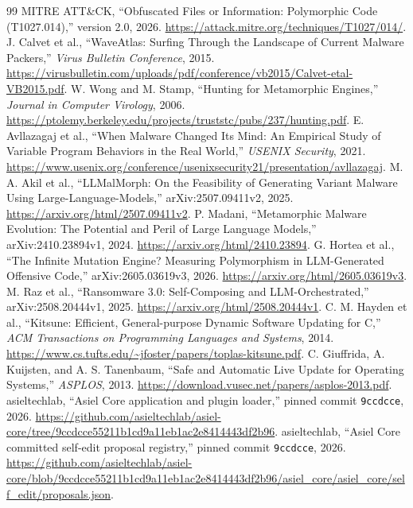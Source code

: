 \documentclass[11pt,letterpaper]{article}
\begin{document}
\begingroup\small\raggedright
\begin{thebibliography}{99}
 MITRE ATT\&CK, ``Obfuscated Files or Information: Polymorphic Code (T1027.014),'' version 2.0, 2026. \url{https://attack.mitre.org/techniques/T1027/014/}.
 J. Calvet et al., ``WaveAtlas: Surfing Through the Landscape of Current Malware Packers,'' \emph{Virus Bulletin Conference}, 2015. \url{https://virusbulletin.com/uploads/pdf/conference/vb2015/Calvet-etal-VB2015.pdf}.
 W. Wong and M. Stamp, ``Hunting for Metamorphic Engines,'' \emph{Journal in Computer Virology}, 2006. \url{https://ptolemy.berkeley.edu/projects/truststc/pubs/237/hunting.pdf}.
 E. Avllazagaj et al., ``When Malware Changed Its Mind: An Empirical Study of Variable Program Behaviors in the Real World,'' \emph{USENIX Security}, 2021. \url{https://www.usenix.org/conference/usenixsecurity21/presentation/avllazagaj}.
 M. A. Akil et al., ``LLMalMorph: On the Feasibility of Generating Variant Malware Using Large-Language-Models,'' arXiv:2507.09411v2, 2025. \url{https://arxiv.org/html/2507.09411v2}.
 P. Madani, ``Metamorphic Malware Evolution: The Potential and Peril of Large Language Models,'' arXiv:2410.23894v1, 2024. \url{https://arxiv.org/html/2410.23894}.
 G. Hortea et al., ``The Infinite Mutation Engine? Measuring Polymorphism in LLM-Generated Offensive Code,'' arXiv:2605.03619v3, 2026. \url{https://arxiv.org/html/2605.03619v3}.
 M. Raz et al., ``Ransomware 3.0: Self-Composing and LLM-Orchestrated,'' arXiv:2508.20444v1, 2025. \url{https://arxiv.org/html/2508.20444v1}.
 C. M. Hayden et al., ``Kitsune: Efficient, General-purpose Dynamic Software Updating for C,'' \emph{ACM Transactions on Programming Languages and Systems}, 2014. \url{https://www.cs.tufts.edu/~jfoster/papers/toplas-kitsune.pdf}.
 C. Giuffrida, A. Kuijsten, and A. S. Tanenbaum, ``Safe and Automatic Live Update for Operating Systems,'' \emph{ASPLOS}, 2013. \url{https://download.vusec.net/papers/asplos-2013.pdf}.
 asieltechlab, ``Asiel Core application and plugin loader,'' pinned commit \texttt{9ccdcce}, 2026. \url{https://github.com/asieltechlab/asiel-core/tree/9ccdcce55211b1cd9a11eb1ac2e8414443df2b96}.
 asieltechlab, ``Asiel Core committed self-edit proposal registry,'' pinned commit \texttt{9ccdcce}, 2026. \url{https://github.com/asieltechlab/asiel-core/blob/9ccdcce55211b1cd9a11eb1ac2e8414443df2b96/asiel_core/asiel_core/self_edit/proposals.json}.

\end{thebibliography}
\end{document}
